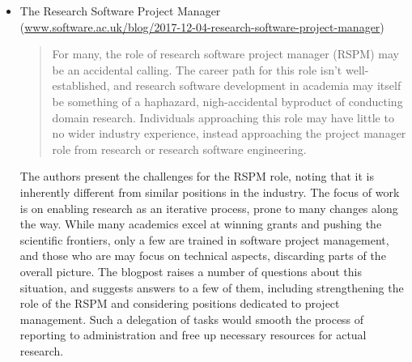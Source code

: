 \documentclass[11pt,letterpaper]{article}
\begin{document}
\begin{itemize}
\item The Research Software Project Manager\\(\href{https://www.software.ac.uk/blog/2017-12-04-research-software-project-manager}{www.software.ac.uk/blog/2017-12-04-research-software-project-manager})
\begin{quote}
For many, the role of research software project manager (RSPM) may be an accidental calling. The career path for this role isn’t well-established, and research software development in academia may itself be something of a haphazard, nigh-accidental byproduct of conducting domain research. Individuals approaching this role may have little to no wider industry experience, instead approaching the project manager role from research or research software engineering.
\end{quote}
The authors present the challenges for the RSPM role, noting that it is inherently different from similar positions in the industry. The focus of work is on enabling research as an iterative process, prone to many changes along the way. While many academics excel at winning grants and pushing the scientific frontiers, only a few are trained in software project management, and those who are may focus on technical aspects, discarding parts of the overall picture. The blogpost raises a number of questions about this situation, and suggests answers to a few of them, including strengthening the role of the RSPM and considering positions dedicated to project management. Such a delegation of tasks would smooth the process of reporting to administration and free up necessary resources for actual research. 



\end{itemize}
\end{document}
